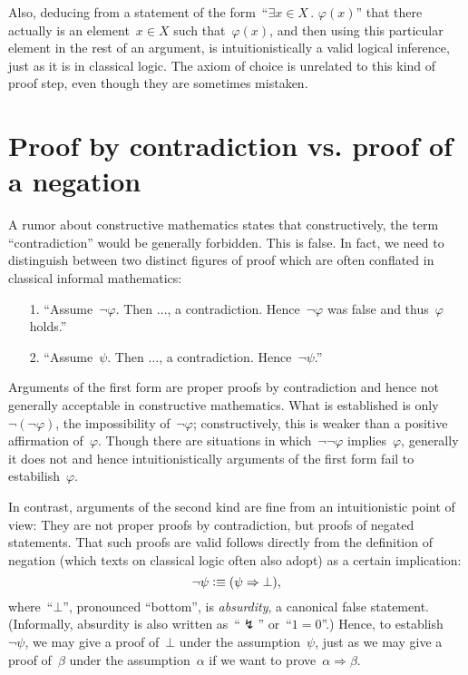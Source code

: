 \documentclass[10pt,reqno,a4paper,openany]{amsbook}
\theoremstyle{definition}
\theoremstyle{plain}
\theoremstyle{remark}
\newcommand{\?}{\,{:}\,}
\renewcommand{\_}{\mathpunct{.}\,}
\newcommand{\defequiv}{\vcentcolon\equiv}
\begin{document}
Also, deducing from a statement of the form~``$\exists x \in X\_ \varphi(x)$''
that there actually is an element~$x \in X$ such that~$\varphi(x)$, and then
using this particular element in the rest of an argument, is intuitionistically a
valid logical inference, just as it is in classical logic. The axiom of choice
is unrelated to this kind of proof step, even though they are sometimes
mistaken.


\section{Proof by contradiction vs. proof of a negation}

A rumor about constructive mathematics states that constructively, the term
``contradiction'' would be generally forbidden. This is false. In fact, we need
to distinguish between two distinct figures of proof which are often conflated
in classical informal mathematics:

\begin{enumerate}
\item[1.] ``Assume~$\neg\varphi$. Then $\ldots$, a contradiction.
Hence~$\neg\varphi$ was false and thus~$\varphi$ holds.''
\item[2.] ``Assume~$\psi$. Then $\ldots$, a contradiction. Hence~$\neg\psi$.''
\end{enumerate}

Arguments of the first form are proper proofs by contradiction and hence not
generally acceptable in constructive mathematics. What is established is
only~$\neg(\neg\varphi)$, the impossibility of~$\neg\varphi$; constructively,
this is weaker than a positive affirmation of~$\varphi$. Though there are
situations in which~$\neg\neg\varphi$ implies~$\varphi$, generally it does not
and hence intuitionistically arguments of the first form fail to
estabilish~$\varphi$.

In contrast, arguments of the second kind are fine from an intuitionistic point
of view: They are not proper proofs by contradiction, but proofs of negated
statements. That such proofs are valid follows directly from the definition of
negation (which texts on classical logic often also adopt) as a certain
implication:
\[ \neg\psi \defequiv (\psi \Rightarrow \bot), \]
where~``$\bot$'', pronounced ``bottom'', is \emph{absurdity}, a canonical false
statement. (Informally, absurdity is also written as~``$\lightning$'' or~``$1 = 0$''.)
Hence, to establish~$\neg\psi$, we may give a proof of~$\bot$ under
the assumption~$\psi$, just as we may give a proof of~$\beta$ under the
assumption~$\alpha$ if we want to prove~$\alpha \Rightarrow \beta$.
\end{document}
